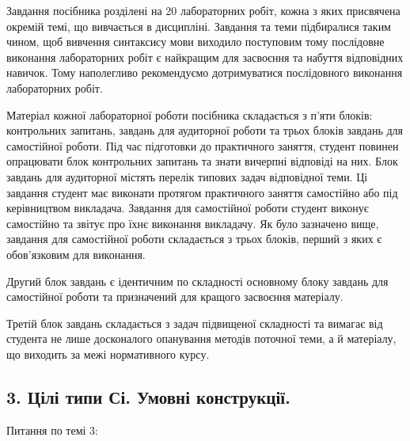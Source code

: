 \documentclass[]{article}
\begin{document}
Завдання посібника розділені на 20 лабораторних робіт, кожна з яких
присвячена окремій темі, що вивчається в дисципліні. Завдання та теми
підбиралися таким чином, щоб вивчення синтаксису мови виходило
поступовим тому послідовне виконання лабораторних робіт є найкращим для
засвоєння та набуття відповідних навичок. Тому наполегливо рекомендуємо
дотримуватися послідовного виконання лабораторних робіт.

Матеріал кожної лабораторної роботи посібника складається з п'яти
блоків: контрольних запитань, завдань для аудиторної роботи та трьох
блоків завдань для самостійної роботи. Під час підготовки до практичного
заняття, студент повинен опрацювати блок контрольних запитань та знати
вичерпні відповіді на них. Блок завдань для аудиторної містять перелік
типових задач відповідної теми. Ці завдання студент має виконати
протягом практичного заняття самостійно або під керівництвом викладача.
Завдання для самостійної роботи студент виконує самостійно та звітує про
їхнє виконання викладачу. Як було зазначено вище, завдання для
самостійної роботи складається з трьох блоків, перший з яких є
обов'язковим для виконання.

Другий блок завдань є ідентичним по складності основному блоку завдань
для самостійної роботи та призначений для кращого засвоєння матеріалу.

Третій блок завдань складається з задач підвищеної складності та вимагає
від студента не лише досконалого опанування методів поточної теми, а й
матеріалу, що виходить за межі нормативного курсу.


\newpage
\subsection{ 3. Цілі типи Сі. Умовні конструкції.}
\setcounter{subsection}{1}

Питання по темі 3:
\end{document}
